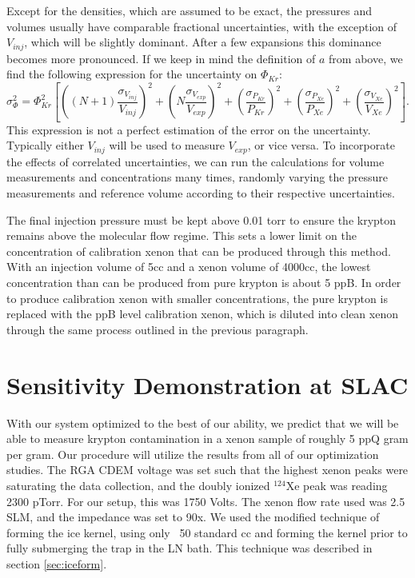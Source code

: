 \documentclass[12pt]{article}
\begin{document}
Except for the densities, which are assumed to be exact, the pressures and volumes usually have comparable fractional uncertainties, with the exception of $V_{inj}$, which will be slightly dominant. After a few expansions this dominance becomes more pronounced. If we keep in mind the definition of $a$ from above, we find the following expression for the uncertainty on $\Phi_{Kr}$:
\begin{equation}
\sigma_{\Phi}^{2} = \Phi_{Kr}^2\left[  \left((N+1)\frac{\sigma_{V_{inj}}}{V_{inj}}\right)^2 + \left(N\frac{\sigma_{V_{exp}}}{V_{exp}}\right)^2  + \left(\frac{\sigma_{P_{Kr}}}{P_{Kr}}\right)^2   + \left(\frac{\sigma_{P_{Xe}}}{P_{Xe}}\right)^2   + \left(\frac{\sigma_{V_{Xe}}}{V_{Xe}}\right)^2  \right].
\end{equation}
This expression is not a perfect estimation of the error on the uncertainty. Typically either $V_{inj}$ will be used to measure $V_{exp}$, or vice versa. To incorporate the effects of correlated uncertainties, we can run the calculations for volume measurements and concentrations many times, randomly varying the pressure measurements and reference volume according to their respective uncertainties.

The final injection pressure must be kept above 0.01 torr to ensure the krypton remains above the molecular flow regime. This sets a lower limit on the concentration of calibration xenon that can be produced through this method. With an injection volume of 5cc and a xenon volume of 4000cc, the lowest concentration than can be produced from pure krypton is about 5 ppB. In order to produce calibration xenon with smaller concentrations, the pure krypton is replaced with the ppB level calibration xenon, which is diluted into clean xenon through the same process outlined in the previous paragraph.



\section{Sensitivity Demonstration at SLAC}
With our system optimized to the best of our ability, we predict that we will be able to measure krypton contamination in a xenon sample of roughly 5 ppQ gram per gram. Our procedure will utilize the results from all of our optimization studies. The RGA CDEM voltage was set such that the highest xenon peaks were saturating the data collection, and the doubly ionized $^{124}$Xe peak was reading 2300 pTorr. For our setup, this was 1750 Volts. The xenon flow rate used was 2.5 SLM, and the impedance was set to 90x. We used the modified technique of forming the ice kernel, using only ~50 standard cc and forming the kernel prior to fully submerging the trap in the LN bath. This technique was described in section \ref{sec:iceform}. 
\end{document}
